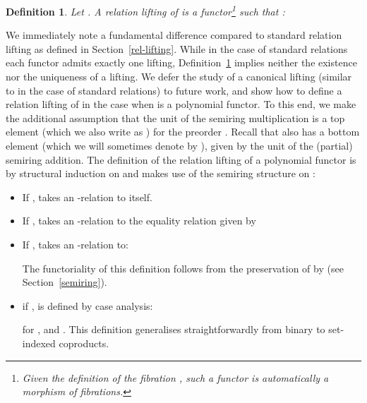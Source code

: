 \documentclass[submission,copyright,creativecommons]{eptcs}
\theoremstyle{plain}\newtheorem{theorem}{Theorem}[section]
\newtheorem{definition}[theorem]{Definition}
\theoremstyle{remark}
\begin{document}
\begin{definition}
\label{def-gen-rel-lifting}
Let . A \emph{relation lifting of } is a functor\footnote{Given the definition of the fibration , such a functor is automatically a morphism of fibrations.}  such that :

\end{definition}
We immediately note a fundamental difference compared to standard relation lifting as defined in Section~\ref{rel-lifting}. While in the case of standard relations each functor admits exactly one lifting, Definition~\ref{def-gen-rel-lifting} implies neither the existence nor the uniqueness of a lifting. We defer the study of a canonical lifting (similar to  in the case of standard relations) to future work, and show how to define a relation lifting of  in the case when  is a polynomial functor. To this end, we make the additional assumption that the unit  of the semiring multiplication is a top element (which we also write as ) for the preorder . Recall that  also has a bottom element (which we will sometimes denote by ), given by the unit  of the (partial) semiring addition. The definition of the relation lifting of a polynomial functor  is by structural induction on  and makes use of the semiring structure on :
\begin{itemize}
\item If ,  takes an -relation to itself.
\item If ,  takes an -relation to the equality relation  given by

\item If ,   takes an -relation  to:

The functoriality of this definition follows from the preservation of  by  (see Section~\ref{semiring}).
\item if ,  is defined by case analysis:

for ,  and . This definition generalises straightforwardly from binary to set-indexed coproducts.
\end{itemize}
\end{document}
